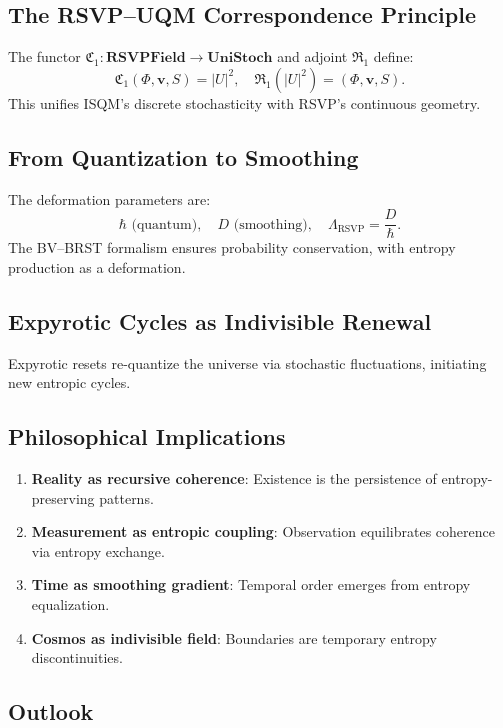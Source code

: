 \documentclass[12pt]{article}
\begin{document}
{\subsection{The RSVP–UQM Correspondence Principle}

The functor \(\mathfrak{C}_1: \mathbf{RSVPField} \to \mathbf{UniStoch}\) and adjoint \(\mathfrak{R}_1\) define:
\[
\mathfrak{C}_1(\Phi, \mathbf{v}, S) = |U|^2, \quad \mathfrak{R}_1(|U|^2) = (\Phi, \mathbf{v}, S).
\]
This unifies ISQM’s discrete stochasticity with RSVP’s continuous geometry.

\subsection{From Quantization to Smoothing}

The deformation parameters are:
\[
\hbar \text{ (quantum)}, \quad D \text{ (smoothing)}, \quad \Lambda_{\mathrm{RSVP}} = \frac{D}{\hbar}.
\]
The BV–BRST formalism ensures probability conservation, with entropy production as a deformation.

\subsection{Expyrotic Cycles as Indivisible Renewal}

Expyrotic resets re-quantize the universe via stochastic fluctuations, initiating new entropic cycles.

\subsection{Philosophical Implications}

\begin{enumerate}[noitemsep]
\item \textbf{Reality as recursive coherence}: Existence is the persistence of entropy-preserving patterns.
\item \textbf{Measurement as entropic coupling}: Observation equilibrates coherence via entropy exchange.
\item \textbf{Time as smoothing gradient}: Temporal order emerges from entropy equalization.
\item \textbf{Cosmos as indivisible field}: Boundaries are temporary entropy discontinuities.
\end{enumerate}

\subsection{Outlook}

}
\end{document}
